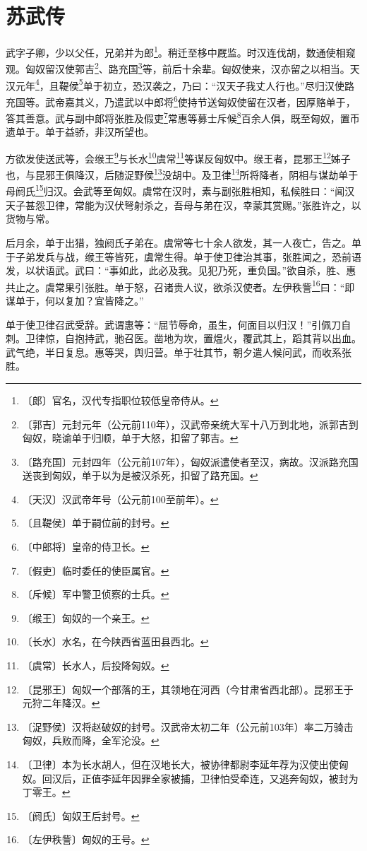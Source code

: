 \documentclass[12pt,UTF-8,openany]{ctexbook}
\begin{document}
\chapter{苏武传}

\begin{normalsize}
    
    武字子卿，少以父任，兄弟并为郎\footnote{〔郎〕官名，汉代专指职位较低皇帝侍从。}。稍迁至栘中厩监。时汉连伐胡，数通使相窥观。匈奴留汉使郭吉\footnote{〔郭吉〕元封元年（公元前110年），汉武帝亲统大军十八万到北地，派郭吉到匈奴，晓谕单于归顺，单于大怒，扣留了郭吉。}、路充国\footnote{〔路充国〕元封四年（公元前107年），匈奴派遣使者至汉，病故。汉派路充国送丧到匈奴，单于以为是被汉杀死，扣留了路充国。}等，前后十余辈。匈奴使来，汉亦留之以相当。天汉元年\footnote{〔天汉〕汉武帝年号（公元前100至前年）。}，且鞮侯\footnote{〔且鞮侯〕单于嗣位前的封号。}单于初立，恐汉袭之，乃曰：“汉天子我丈人行也。”尽归汉使路充国等。武帝嘉其义，乃遣武以中郎将\footnote{〔中郎将〕皇帝的侍卫长。}使持节送匈奴使留在汉者，因厚赂单于，答其善意。武与副中郎将张胜及假吏\footnote{〔假吏〕临时委任的使臣属官。}常惠等募士斥候\footnote{〔斥候〕军中警卫侦察的士兵。}百余人俱，既至匈奴，置币遗单于。单于益骄，非汉所望也。
    
    方欲发使送武等，会缑王\footnote{〔缑王〕匈奴的一个亲王。}与长水\footnote{〔长水〕水名，在今陕西省蓝田县西北。}虞常\footnote{〔虞常〕长水人，后投降匈奴。}等谋反匈奴中。缑王者，昆邪王\footnote{〔昆邪王〕匈奴一个部落的王，其领地在河西（今甘肃省西北部）。昆邪王于元狩二年降汉。}姊子也，与昆邪王俱降汉，后随浞野侯\footnote{〔浞野侯〕汉将赵破奴的封号。汉武帝太初二年（公元前103年）率二万骑击匈奴，兵败而降，全军沦没。}没胡中。及卫律\footnote{〔卫律〕本为长水胡人，但在汉地长大，被协律都尉李延年荐为汉使出使匈奴。回汉后，正值李延年因罪全家被捕，卫律怕受牵连，又逃奔匈奴，被封为丁零王。}所将降者，阴相与谋劫单于母阏氏\footnote{〔阏氏〕匈奴王后封号。}归汉。会武等至匈奴。虞常在汉时，素与副张胜相知，私候胜曰：“闻汉天子甚怨卫律，常能为汉伏弩射杀之，吾母与弟在汉，幸蒙其赏赐。”张胜许之，以货物与常。
    
    后月余，单于出猎，独阏氏子弟在。虞常等七十余人欲发，其一人夜亡，告之。单于子弟发兵与战，缑王等皆死，虞常生得。单于使卫律治其事，张胜闻之，恐前语发，以状语武。武曰：“事如此，此必及我。见犯乃死，重负国。”欲自杀，胜、惠共止之。虞常果引张胜。单于怒，召诸贵人议，欲杀汉使者。左伊秩訾\footnote{〔左伊秩訾〕匈奴的王号。}曰：“即谋单于，何以复加？宜皆降之。”
    
    单于使卫律召武受辞。武谓惠等：“屈节辱命，虽生，何面目以归汉！”引佩刀自刺。卫律惊，自抱持武，驰召医。凿地为坎，置煴火，覆武其上，蹈其背以出血。武气绝，半日复息。惠等哭，舆归营。单于壮其节，朝夕遣人候问武，而收系张胜。
    

\end{normalsize}
\end{document}
